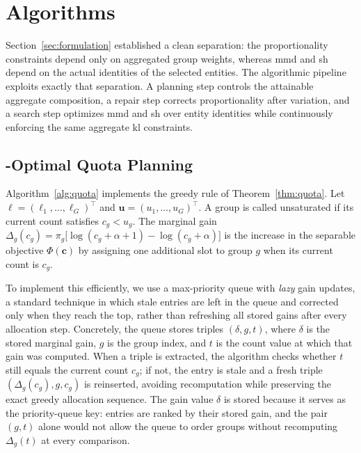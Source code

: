 \documentclass[10pt,journal]{IEEEtran}
\newcommand{\1}{\mathbf{1}}
\newcommand{\bc}{\mathbf{c}}
\theoremstyle{ieeethm}
\begin{document}
\section{Algorithms}
\label{sec:search}

Section~\ref{sec:formulation} established a clean separation: the proportionality constraints depend only on aggregated group weights, whereas \gls{mmd} and \gls{sh} depend on the actual identities of the selected entities. The algorithmic pipeline exploits exactly that separation. A planning step controls the attainable aggregate composition, a repair step corrects proportionality after variation, and a search step optimizes \gls{mmd} and \gls{sh} over entity identities while continuously enforcing the same aggregate \gls{kl} constraints.

\subsection{-Optimal Quota Planning}
\label{subsec:algo_quota}

Algorithm~\ref{alg:quota} implements the greedy rule of Theorem~\ref{thm:quota}. Let $\boldsymbol{\ell}=(\ell_1,\dots,\ell_G)^\top$ and $\mathbf u=(u_1,\dots,u_G)^\top$. A group is called unsaturated if its current count satisfies $c_g<u_g$. The marginal gain $\Delta_g(c_g)
=
\pi_g\big[\log(c_g+\alpha+1)-\log(c_g+\alpha)\big]$
is the increase in the separable objective $\Phi(\bc)$ by assigning one additional slot to group $g$ when its current count is $c_g$.

To implement this efficiently, we use a max-priority queue with \emph{lazy} gain updates, a standard technique in which stale entries are left in the queue and corrected only when they reach the top, rather than refreshing all stored gains after every allocation step. Concretely, the queue stores triples $(\delta,g,t)$, where $\delta$ is the stored marginal gain, $g$ is the group index, and $t$ is the count value at which that gain was computed. When a triple is extracted, the algorithm checks whether $t$ still equals the current count $c_g$; if not, the entry is stale and a fresh triple $(\Delta_g(c_g),g,c_g)$ is reinserted, avoiding recomputation while preserving the exact greedy allocation sequence. The gain value $\delta$ is stored because it serves as the priority-queue key: entries are ranked by their stored gain, and the pair $(g,t)$ alone would not allow the queue to order groups without recomputing $\Delta_g(t)$ at every comparison.
\end{document}
